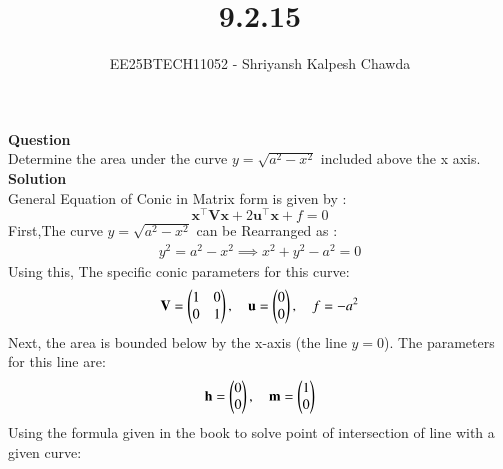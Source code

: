 \documentclass[article]{IEEEtran}
\begin{document}
	\title{9.2.15}
	\author{EE25BTECH11052 - Shriyansh Kalpesh Chawda}
	\maketitle
\textbf{Question}\\
Determine the area under the curve $y = \sqrt{a^2 - x^2}$ included above the  x axis.\\
\textbf{Solution}\\
General Equation of Conic in Matrix form is given by :
\begin{equation}
	\mathbf{x}^\top\mathbf{V}\mathbf{x} + 2\mathbf{u}^\top\mathbf{x} + f = 0
	\label{eq:matrix_conic}
\end{equation}
First,The  curve $y = \sqrt{a^2 - x^2}$ can be Rearranged as : 
\begin{align}
y^2 = a^2 - x^2 \implies x^2 + y^2 - a^2 = 0
\end{align}
Using this, The specific conic parameters for this curve:
\begin{equation}
	\mathbf{V} = \begin{pmatrix}1 & 0 \\ 0 & 1\end{pmatrix}, \quad \mathbf{u} = \begin{pmatrix}0 \\ 0\end{pmatrix}, \quad f = -a^2
\end{equation}
Next, the area is bounded below by the x-axis (the line $y=0$). The parameters for this line are:
\begin{equation}
	\mathbf{h} = \begin{pmatrix}0 \\ 0\end{pmatrix}, \quad \mathbf{m} = \begin{pmatrix}1 \\ 0\end{pmatrix}
\end{equation}
Using the formula given in the  book to solve point of intersection of line with a given curve:
\end{document}

